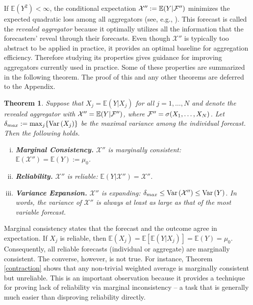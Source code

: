 \documentclass[11pt]{article}
\newcommand{\E}{\mathbb{E}}
\newtheorem{theorem}{Theorem}[section]
\theoremstyle{definition}
\theoremstyle{definition}
\def\F{{\cal F}}
\def\E{{\mathbb E}}
\def\Var{{\rm Var}\,}
\begin{document}
If $\E\left(Y^2\right) < \infty$, the conditional expectation
$\mathcal{X}'' := \E(Y | \F'')$ minimizes the expected quadratic loss
among all aggregators (see, e.g., \citealt{durrett2010probability}). This forecast is called the \textit{revealed
aggregator} because it optimally utilizes all the information that the
forecasters' reveal through their forecasts. Even though
$\mathcal{X}'' $ is typically too abstract to be applied in practice,
it provides an optimal baseline for aggregation
efficiency. Therefore studying its properties gives guidance for
improving aggregators currently used in practice. Some of these
properties are summarized in the following theorem. The proof of this
and any other theorems are deferred to the Appendix.



\begin{theorem} \label{optimal}
Suppose that $X_j = \E(Y | X_j)$ for all $j = 1, \dots, N$ and denote the revealed aggregator with $\mathcal{X}'' = \E(Y | \F'')$, where $\F'' = \sigma(X_1, \dots, X_N)$. 
Let $\delta_{max} := \max_j \{ \Var(X_j)  \}$ be the maximal variance among the individual forecast.
 Then the following holds.
\begin{enumerate}[i)] \label{properties}
\item \textbf{Marginal Consistency.} $\mathcal{X}''$ is marginally consistent:  $\E(\mathcal{X}'') = \E(Y) :=  \mu_0$.
\item \textbf{Reliability.} $\mathcal{X}''$ is reliable: $\E(Y|\mathcal{X}'') = \mathcal{X}''$. 
\item \textbf{Variance Expansion.} $\mathcal{X}''$ is expanding: $\delta_{max} \leq \Var(\mathcal{X}'') \leq \Var(Y)$. In words, the variance of $\mathcal{X}''$ is always at least as large as that of the most variable forecast. 
\end{enumerate}
\end{theorem}
Marginal consistency states that the forecast and the outcome agree in expectation. If $X_j$ is reliable, then $\E(X_j) = \E[\E(Y|X_j)] = \E(Y) = \mu_0$. Consequently, all reliable forecasts (individual or aggregate) are marginally consistent. The converse, however, is not true. For instance, Theorem \ref{contraction} shows that any non-trivial weighted average is marginally consistent but unreliable. This is an important observation because it provides a technique for proving lack of reliability via marginal inconsistency -- a task that is generally much easier than disproving reliability directly.
\end{document}
